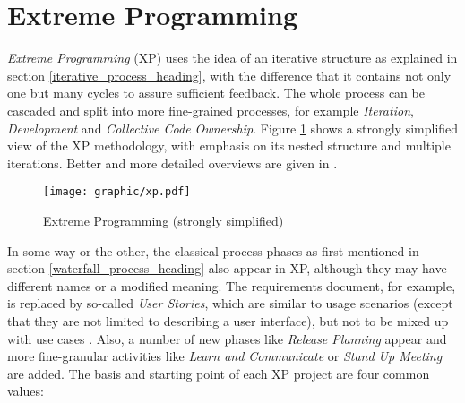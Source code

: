 %
%
%
%
%
%
%

\section{Extreme Programming}
\label{extreme_programming_heading}

\emph{Extreme Programming} (XP) uses the idea of an iterative structure as
explained in section \ref{iterative_process_heading}, with the difference that
it contains not only one but many cycles to assure sufficient feedback. The whole
process can be cascaded and split into more fine-grained processes, for example
\emph{Iteration}, \emph{Development} and \emph{Collective Code Ownership}.
Figure \ref{xp_figure} shows a strongly simplified view of the XP methodology,
with emphasis on its nested structure and multiple iterations. Better and more
detailed overviews are given in \cite{xp}.

\begin{figure}[ht]
    \begin{center}
        \texttt{[image: graphic/xp.pdf]}
        \caption{Extreme Programming (strongly simplified)}
        \label{xp_figure}
    \end{center}
\end{figure}

In some way or the other, the classical process phases as first mentioned in
section \ref{waterfall_process_heading} also appear in XP, although they may
have different names or a modified meaning. The requirements document, for
example, is replaced by so-called \emph{User Stories}, which are similar to
usage scenarios (except that they are not limited to describing a user
interface), but not to be mixed up with use cases \cite{xp}. Also, a number of
new phases like \emph{Release Planning} appear and more fine-granular
activities like \emph{Learn and Communicate} or \emph{Stand Up Meeting} are
added. The basis and starting point of each XP project are four common values:

